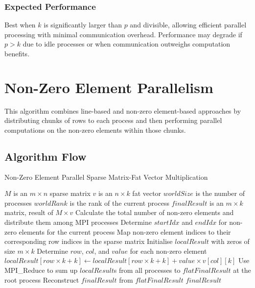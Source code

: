 \documentclass[12pt,oneside]{book} %
\begin{document}
\subsubsection{Expected Performance}
Best when $k$ is significantly larger than $p$ and divisible, allowing
efficient parallel processing with minimal communication overhead. Performance
may degrade if $p > k$ due to idle processes or when communication outweighs
computation benefits.

\newpage
\section{Non-Zero Element Parallelism}
This algorithm combines line-based and non-zero element-based approaches by
distributing chunks of rows to each process and then performing parallel
computations on the non-zero elements within those chunks.

\subsection{Algorithm Flow}

\begin{algorithm}
    \caption{Non-Zero Element Parallel Sparse Matrix-Fat Vector Multiplication}
    \begin{algorithmic}
        \Require $M$ is an $m \times n$ sparse matrix
        \Require $v$ is an $n \times k$ fat vector
        \Require $worldSize$ is the number of processes
        \Require $worldRank$ is the rank of the current process
        \Ensure  $finalResult$ is an $m \times k$ matrix, result of $M \times v$
        \State Calculate the total number of non-zero elements and distribute them among MPI processes
        \State Determine $startIdx$ and $endIdx$ for non-zero elements for the current process
        \State Map non-zero element indices to their corresponding row indices in the sparse matrix
        \State Initialise $localResult$ with zeros of size $m \times k$
        \State Determine $row$, $col$, and $value$ for each non-zero element
        \State $localResult[row \times k + k] \gets localResult[row \times k + k] + value \times v[col][k]$
        \EndFor
        \EndFor
        \State Use MPI\_Reduce to sum up $localResult$s from all processes to $flatFinalResult$ at the root process
        \State Reconstruct $finalResult$ from $flatFinalResult$
        \State \Return $finalResult$
        \EndIf
    \end{algorithmic}
\end{algorithm}
\end{document}
